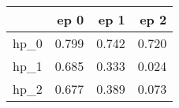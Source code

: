 \begin{tabular}{lrrr}
\toprule
{} &   ep 0 &   ep 1 &   ep 2 \\
\midrule
hp\_0 &  0.799 &  0.742 &  0.720 \\
hp\_1 &  0.685 &  0.333 &  0.024 \\
hp\_2 &  0.677 &  0.389 &  0.073 \\
\bottomrule
\end{tabular}
